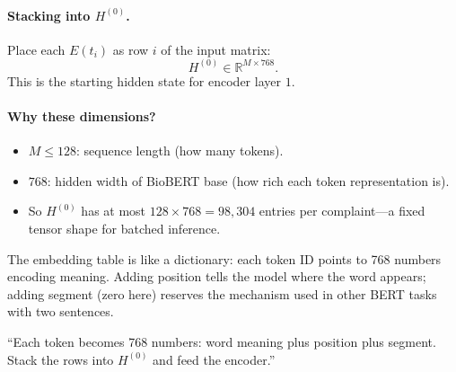 \paragraph{Stacking into \(H^{(0)}\).}
Place each \(E(t_i)\) as row \(i\) of the input matrix:
\begin{equation}
  H^{(0)} \in \mathbb{R}^{M \times 768}.
  \label{eq:H0}
\end{equation}
This is the starting hidden state for encoder layer \(1\).

\paragraph{Why these dimensions?}
\begin{itemize}
  \item \(M\leq 128\): sequence length (how many tokens).
  \item \(768\): hidden width of BioBERT base (how rich each token representation is).
  \item So \(H^{(0)}\) has at most \(128\times 768 = 98{,}304\) entries per complaint---a fixed tensor shape for batched inference.
\end{itemize}

\begin{remark}
The embedding table is like a dictionary: each token ID points to 768 numbers encoding meaning.
Adding position tells the model where the word appears; adding segment (zero here) reserves the mechanism used in other BERT tasks with two sentences.
\end{remark}

\begin{saybox}
``Each token becomes 768 numbers: word meaning plus position plus segment. Stack the rows into \(H^{(0)}\) and feed the encoder.''
\end{saybox}
